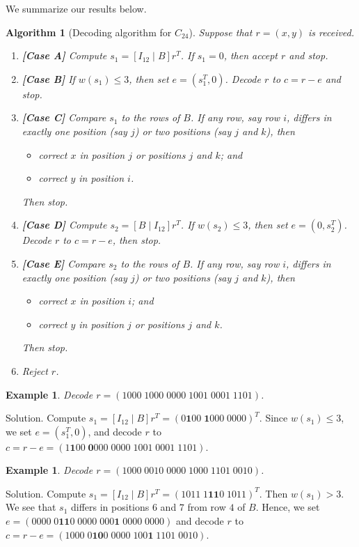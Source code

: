 \documentclass[10pt]{article}
\theoremstyle{newstyle}
\newtheorem{exmp}[thm]{Example}
\newtheorem{algo}[thm]{Algorithm}
\begin{document}
We summarize our results below. 

\begin{algo}[Decoding algorithm for $C_{24}$]
Suppose that $r = (x, y)$ is received.
\begin{enumerate}[(1)]
    \item {\bf [Case A]} Compute $s_1 = [I_{12} \mid B]r^T$. If $s_1 = 0$, then accept $r$ and stop.
    \item {\bf [Case B]} If $w(s_1) \leq 3$, then set $e = (s_1^T, 0)$. Decode $r$ to $c = r-e$ and stop.
    \item {\bf [Case C]} Compare $s_1$ to the rows of $B$. If any row, say row $i$, differs in 
    exactly one position (say $j$) or two positions (say $j$ and $k$), then 
    \begin{itemize}
        \item correct $x$ in position $j$ or positions $j$ and $k$; and 
        \item correct $y$ in position $i$.
    \end{itemize}
    Then stop.
    \item {\bf [Case D]} Compute $s_2 = [B \mid I_{12}]r^T$. If $w(s_2) \leq 3$, then 
    set $e = (0, s_2^T)$. Decode $r$ to $c = r-e$, then stop. 
    \item {\bf [Case E]} Compare $s_2$ to the rows of $B$. If any row, say row $i$, differs in 
    exactly one position (say $j$) or two positions (say $j$ and $k$), then 
    \begin{itemize}
        \item correct $x$ in position $i$; and 
        \item correct $y$ in position $j$ or positions $j$ and $k$.
    \end{itemize}
    Then stop.
    \item Reject $r$. 
\end{enumerate}
\end{algo}

\begin{exmp}
Decode $r = (1000\;1000\;0000\;1001\;0001\;1101)$. 
\end{exmp}
{\sc Solution.} Compute $s_1 = [I_{12} \mid B]r^T = (0\mathbf{1}00\;\mathbf{1}000\;0000)^T$. 
Since $w(s_1) \leq 3$, we set $e = (s_1^T, 0)$, and decode $r$ to 
$c = r-e = (1\mathbf{1}00\;\mathbf{0}000\; 0000\;1001\;0001\;1101)$.

\begin{exmp}
Decode $r = (1000\;0010\;0000\;1000\;1101\;0010)$. 
\end{exmp}
{\sc Solution.} Compute $s_1 = [I_{12} \mid B]r^T = (1011\;1\mathbf{11}0\;1011)^T$. 
Then $w(s_1) > 3$. We see that $s_1$ differs in positions $6$ and $7$ from row $4$ of $B$. 
Hence, we set $e = (0000\;0\mathbf{11}0\;0000\;000\mathbf{1}\;0000\;0000)$ and decode 
$r$ to $c = r-e = (1000\;0\mathbf{10}0\;0000\;100\mathbf{1}\;1101\;0010)$.
\end{document}

